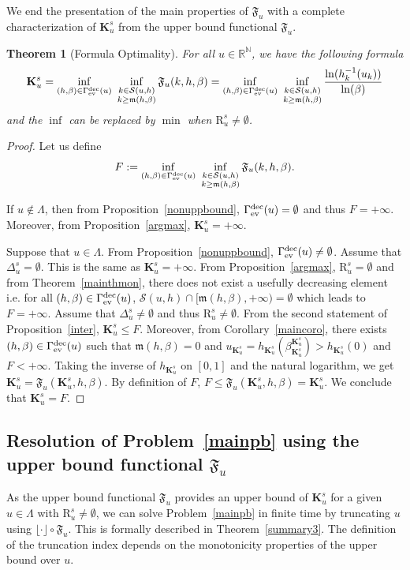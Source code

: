 \documentclass{article}
\newcommand\comment[1]{}
\def\funset{\Gamma}
\def\fmong{\funset_{{\rm ev}}^{\rm dec}}
\def\mon{\mathfrak{m}}
\def\Fu{\mathfrak{F}_u}
\def\rr{\mathbb R}
\def\nn{\mathbb N}
\def\ff{F}
\def\gs{\Delta^s}
\def\bigks{\mathbf{K}^s}
\def\gls#1{{\mathrm R}_{#1}}
\def\gsls#1{\gls{#1}^s}
\def\res{\mathcal{S}}
\newtheorem{theorem}{Theorem}
\def\red#1{#1}
\def\blue#1{#1}
\begin{document}
	We \red{end} the presentation of the main properties of $\Fu$ with a complete characterization of $\bigks_u$ from the upper bound \red{functional} $\Fu$.
	\begin{theorem}[Formula Optimality]
		\label{formulaopt}
		For all $u\in\rr^\nn$, we have the following formula
		\[
		\bigks_u = \inf_{(h,\beta)\in\fmong(u)}\ \inf_{\substack{k\in\res(u,h)\\ k\geq \mon(h,\beta)}} \Fu(k,h,\beta)=  \inf_{(h,\beta)\in\fmong(u)}\ \inf_{\substack{k\in\res(u,h)\\ k\geq \mon(h,\beta)}}\dfrac{\ln(h_{\red{k}}^{-1}(u_k))}{\ln(\beta)}
		\]
		and the $\inf$ can be replaced by $\min$ when $\gsls{u}\neq \emptyset$.
	\end{theorem}
		\begin{proof}
			Let us define 
			\[
			\ff:=\inf_{(h,\beta)\in\fmong(u)}\ \inf_{\substack{k\in\res(u,h)\\ k\geq \mon(h,\beta)}} \Fu(k,h,\beta).
			\]
			
			If $u\notin \Lambda$, then from Proposition~\ref{nonuppbound}, $\fmong(u)=\emptyset$ and thus $\ff=+\infty$. Moreover, from Proposition~\ref{argmax}, $\bigks_u=+\infty$.
			
			Suppose that $u\in \Lambda$. From Proposition~\ref{nonuppbound}, $\fmong(u)\neq\emptyset$. 
			Assume that $\gs_u=\emptyset$. This is the same as $\bigks_u=+\infty$. From Proposition~\ref{argmax}, $\gsls{u}=\emptyset$ and from Theorem~\ref{mainthmon}, there does not exist a usefully decreasing element i.e. for all $(h,\beta)\in\fmong(u)$, $\res(u,h)\cap [\mon(h,\beta),+\infty)=\emptyset$ which leads to $\ff=+\infty$. Assume that $\gs_u\neq\emptyset$ and thus $\gsls{u}\neq \emptyset$. From the second statement of Proposition~\ref{inter}, $\bigks_u\leq \ff$. Moreover, from Corollary~\ref{maincoro}, there exists \blue{$(h,\beta)\in\fmong(u)$ such that $\mon(h,\beta)=0$} and $u_{\bigks_u}=h_{\bigks_u}(\beta_{\bigks_u}^{\bigks_u})>h_{\bigks_u}(0)$ and $\ff<+\infty$. Taking the inverse of $h_{\bigks_u}$ on $[0,1]$ and the natural logarithm, we get $\bigks_u=\Fu(\bigks_u,h,\beta)$. By definition of $\ff$, $\ff\leq\Fu(\bigks_u,h,\beta) =\bigks_u$. We conclude that $\bigks_u=\ff$.
		\end{proof}
		\subsection{Resolution of Problem~\ref{mainpb} using the upper bound functional $\Fu$}
		\label{subsec:algo}
		As the upper bound \red{functional} $\Fu$ provides an upper bound of $\bigks_u$ for a given $u\in\Lambda$ with $\gsls{u}\neq \emptyset$, we can solve Problem~\ref{mainpb} in finite time \red{by} truncating $u$ \blue{using} $\lfloor\cdot\rfloor\circ \Fu$. This is formally described in Theorem~\ref{summary3}. The definition of the truncation index depends on the \blue{monotonicity properties} of the upper bound over $u$. 
		
\end{document}
